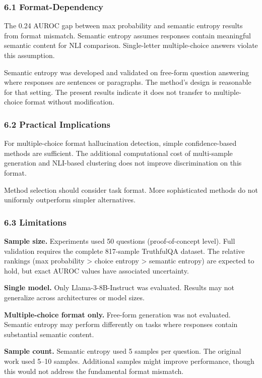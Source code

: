 
\subsubsection{6.1 Format-Dependency}

The 0.24 AUROC gap between max probability and semantic entropy results from format mismatch. Semantic entropy assumes responses contain meaningful semantic content for NLI comparison. Single-letter multiple-choice answers violate this assumption.

Semantic entropy was developed and validated on free-form question answering where responses are sentences or paragraphs. The method's design is reasonable for that setting. The present results indicate it does not transfer to multiple-choice format without modification.

\subsubsection{6.2 Practical Implications}

For multiple-choice format hallucination detection, simple confidence-based methods are sufficient. The additional computational cost of multi-sample generation and NLI-based clustering does not improve discrimination on this format.

Method selection should consider task format. More sophisticated methods do not uniformly outperform simpler alternatives.

\subsubsection{6.3 Limitations}

\textbf{Sample size.} Experiments used 50 questions (proof-of-concept level). Full validation requires the complete 817-sample TruthfulQA dataset. The relative rankings (max probability > choice entropy > semantic entropy) are expected to hold, but exact AUROC values have associated uncertainty.

\textbf{Single model.} Only Llama-3-8B-Instruct was evaluated. Results may not generalize across architectures or model sizes.

\textbf{Multiple-choice format only.} Free-form generation was not evaluated. Semantic entropy may perform differently on tasks where responses contain substantial semantic content.

\textbf{Sample count.} Semantic entropy used 5 samples per question. The original work used 5--10 samples. Additional samples might improve performance, though this would not address the fundamental format mismatch.

